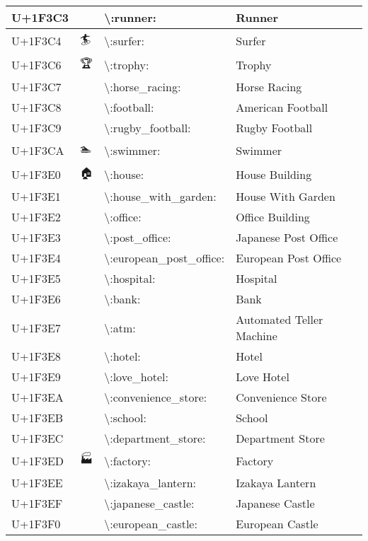 \begin{table}[h]
\begin{tabulary}{\linewidth}{|L|L|L|L|}
\hline
U+1F3C3 & 🏃 & {\textbackslash}:runner: & Runner \\
\hline
U+1F3C4 & 🏄 & {\textbackslash}:surfer: & Surfer \\
\hline
U+1F3C6 & 🏆 & {\textbackslash}:trophy: & Trophy \\
\hline
U+1F3C7 & 🏇 & {\textbackslash}:horse\_racing: & Horse Racing \\
\hline
U+1F3C8 & 🏈 & {\textbackslash}:football: & American Football \\
\hline
U+1F3C9 & 🏉 & {\textbackslash}:rugby\_football: & Rugby Football \\
\hline
U+1F3CA & 🏊 & {\textbackslash}:swimmer: & Swimmer \\
\hline
U+1F3E0 & 🏠 & {\textbackslash}:house: & House Building \\
\hline
U+1F3E1 & 🏡 & {\textbackslash}:house\_with\_garden: & House With Garden \\
\hline
U+1F3E2 & 🏢 & {\textbackslash}:office: & Office Building \\
\hline
U+1F3E3 & 🏣 & {\textbackslash}:post\_office: & Japanese Post Office \\
\hline
U+1F3E4 & 🏤 & {\textbackslash}:european\_post\_office: & European Post Office \\
\hline
U+1F3E5 & 🏥 & {\textbackslash}:hospital: & Hospital \\
\hline
U+1F3E6 & 🏦 & {\textbackslash}:bank: & Bank \\
\hline
U+1F3E7 & 🏧 & {\textbackslash}:atm: & Automated Teller Machine \\
\hline
U+1F3E8 & 🏨 & {\textbackslash}:hotel: & Hotel \\
\hline
U+1F3E9 & 🏩 & {\textbackslash}:love\_hotel: & Love Hotel \\
\hline
U+1F3EA & 🏪 & {\textbackslash}:convenience\_store: & Convenience Store \\
\hline
U+1F3EB & 🏫 & {\textbackslash}:school: & School \\
\hline
U+1F3EC & 🏬 & {\textbackslash}:department\_store: & Department Store \\
\hline
U+1F3ED & 🏭 & {\textbackslash}:factory: & Factory \\
\hline
U+1F3EE & 🏮 & {\textbackslash}:izakaya\_lantern: & Izakaya Lantern \\
\hline
U+1F3EF & 🏯 & {\textbackslash}:japanese\_castle: & Japanese Castle \\
\hline
U+1F3F0 & 🏰 & {\textbackslash}:european\_castle: & European Castle \\

\end{tabulary}
\end{table}

